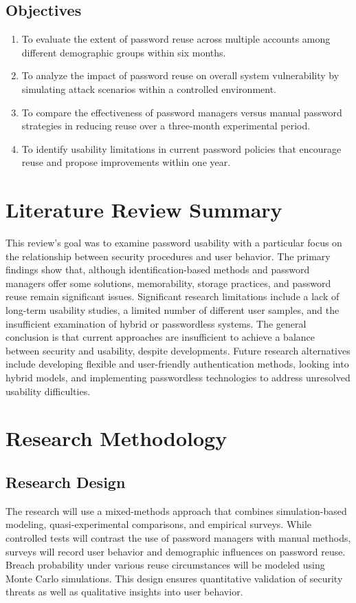 \documentclass[a4paper, 12pt]{article}
\begin{document}
\subsection*{Objectives}
\begin{enumerate}
	\item To evaluate the extent of password reuse across multiple accounts among different demographic groups within six months.
    
    \item To analyze the impact of password reuse on overall system vulnerability by simulating attack scenarios within a controlled environment.

    \item To compare the effectiveness of password managers versus manual password strategies in reducing reuse over a three-month experimental period.
    
    \item To identify usability limitations in current password policies that encourage reuse and propose improvements within one year.

\end{enumerate}

\section{Literature Review Summary}
This review's goal was to examine password usability with a particular focus on the relationship between security procedures and user behavior. The primary findings show that, although identification-based methods and password managers offer some solutions, memorability, storage practices, and password reuse remain significant issues. Significant research limitations include a lack of long-term usability studies, a limited number of different user samples, and the insufficient examination of hybrid or passwordless systems. The general conclusion is that current approaches are insufficient to achieve a balance between security and usability, despite developments. Future research alternatives include developing flexible and user-friendly authentication methods, looking into hybrid models, and implementing passwordless technologies to address unresolved usability difficulties.

\section{Research Methodology}

\subsection{Research Design}
The research will use a mixed-methods approach that combines simulation-based modeling, quasi-experimental comparisons, and empirical surveys. While controlled tests will contrast the use of password managers with manual methods, surveys will record user behavior and demographic influences on password reuse. Breach probability under various reuse circumstances will be modeled using Monte Carlo simulations. This design ensures quantitative validation of security threats as well as qualitative insights into user behavior.
\end{document}
